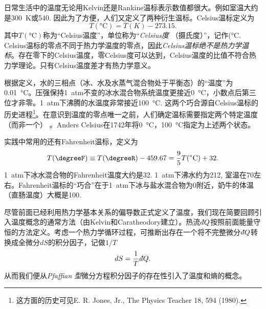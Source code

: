 日常生活中的温度无论用Kelvin还是Rankine温标表示数值都很大。例如室温大约是\SI{300}{\kelvin}或\SI{540}{\degreeR}. 因此为了方便，人们又定义了两种衍生温标。Celsius温标定义为
\begin{equation}
\label{equ2.43}
	T(\si{\degreeCelsius}) = T(K) - 273.15.
\end{equation}
其中$T(\si{\degreeCelsius})$称为“Celsius温度”，单位称为“{\it Celsius度} （摄氏度）”，记作(\si{\degreeCelsius}. Celsius温标的零点不同于热力学温度的零点，因此{\it Celsius温标绝不是热力学温标}。存在零下的Celsius温度，零Celsius度可以达到，Celsius温度的比值不符合热力学理论。只有Celsius温度差才有热力学意义。

根据定义，水的三相点（冰、水及水蒸气混合物处于平衡态）的“温度”为\SI{0.01}{\degreeCelsius}。压强保持\SI{1}{atm}不变的冰水混合物系统温度更接近\SI{0}{\degreeCelsius}，小数点后第三位才非零。\SI{1}{atm}下沸腾的水温度非常接近\SI{100}{\degreeCelsius}. 这两个巧合源自Celsius温标的历史进程\footnote{这方面的历史可见E. R. Jones, Jr., The Physics Teacher 18, 594 (1980). }。在意识到温度的零点唯一之前，人们确定温标需要指定两个特定温度（而非一个）%
%
。Anders Celsius在1742年将\SI{0}{\degreeCelsius}，\SI{100}{\degreeCelsius}指定为上述两个状态。

实践中常用的还有Fahrenheit温标，定义为
\begin{equation}
\label{equ2.44}
	T(\si{\degreeF}) \equiv T(\si{\degreeR}) - 459.67 = \frac{9}{5} T(\si{\degreeCelsius}) + 32.
\end{equation}
\SI{1}{atm}下冰水混合物的Fahrenheit温度大约是\SI{32}{\degreeF}. \SI{1}{atm}下沸水约为\SI{212}{\degreeF}, 室温在\SI{70}{\degreeF}左右。Fahrenheit温标的“巧合”在于\SI{1}{atm}下冰与盐水混合物为\SI{0}{\degreeF}附近，奶牛的体温（直肠温度）大概是\SI{100}{\degreeF}.

尽管前面已经利用热力学基本关系的偏导数正式定义了温度，我们现在简要回顾引入温度概念的通常方法（由Kelvin和Caratheodory建立）。热流$d\hspace*{-0.08em}\bar{}\hspace*{0.1em} Q$按照前面能量守恒的方法定义。考虑一个热力学循环过程，可推断出存在一个将不完整微分$d\hspace*{-0.08em}\bar{}\hspace*{0.1em} Q$转换成全微分$dS$的积分因子，记做$1/T$
\begin{equation}
\label{equ2.45}
	dS = \frac{1}{T} d\hspace*{-0.08em}\bar{}\hspace*{0.1em} Q.
\end{equation}
从而我们便从{\it Pfaffian 型}微分方程积分因子的存在性引入了温度和熵的概念。


